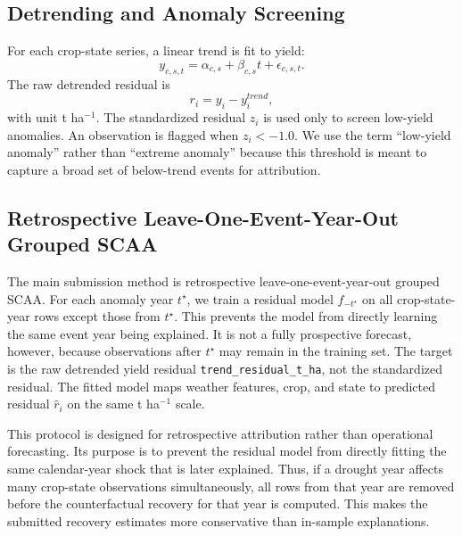 \documentclass[11pt]{article}
\begin{document}
\subsection{Detrending and Anomaly Screening}
For each crop-state series, a linear trend is fit to yield:
\begin{equation}
  y_{c,s,t} = \alpha_{c,s} + \beta_{c,s} t + \epsilon_{c,s,t}.
\end{equation}
The raw detrended residual is
\begin{equation}
  r_i = y_i - y^{trend}_i,
\end{equation}
with unit t ha$^{-1}$. The standardized residual $z_i$ is used only to screen
low-yield anomalies. An observation is flagged when $z_i < -1.0$. We use the term
``low-yield anomaly'' rather than ``extreme anomaly'' because this threshold is meant
to capture a broad set of below-trend events for attribution.

\subsection{Retrospective Leave-One-Event-Year-Out Grouped SCAA}
The main submission method is retrospective leave-one-event-year-out grouped SCAA. For
each anomaly year $t^\star$, we train a residual model $f_{-t^\star}$ on all
crop-state-year rows except those from $t^\star$. This prevents the model from directly
learning the same event year being explained. It is not a fully prospective forecast,
however, because observations after $t^\star$ may remain in the training set. The
target is the raw detrended yield residual \texttt{trend\_residual\_t\_ha}, not the
standardized residual. The fitted model maps weather features, crop, and state to
predicted residual $\hat r_i$ on the same t ha$^{-1}$ scale.

This protocol is designed for retrospective attribution rather than operational
forecasting. Its purpose is to prevent the residual model from directly fitting the
same calendar-year shock that is later explained. Thus, if a drought year affects
many crop-state observations simultaneously, all rows from that year are removed
before the counterfactual recovery for that year is computed. This makes the
submitted recovery estimates more conservative than in-sample explanations.
\end{document}
